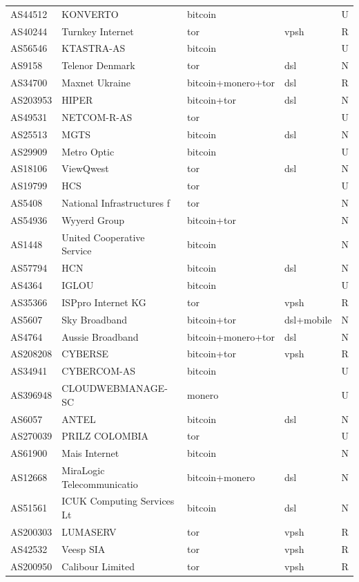 \begin{longtable}{lllll}
AS44512 & KONVERTO & bitcoin &  & U \\ 
AS40244 & Turnkey Internet & tor & vpsh & R \\ 
AS56546 & KTASTRA-AS & bitcoin &  & U \\ 
AS9158 & Telenor Denmark & tor & dsl & N \\ 
AS34700 & Maxnet Ukraine & bitcoin+monero+tor & dsl & R \\ 
AS203953 & HIPER & bitcoin+tor & dsl & N \\ 
AS49531 & NETCOM-R-AS & tor &  & U \\ 
AS25513 & MGTS & bitcoin & dsl & N \\ 
AS29909 & Metro Optic & bitcoin &  & U \\ 
AS18106 & ViewQwest & tor & dsl & N \\ 
AS19799 & HCS & tor &  & U \\ 
AS5408 & National Infrastructures f & tor &  & N \\ 
AS54936 & Wyyerd Group & bitcoin+tor &  & N \\ 
AS1448 & United Cooperative Service & bitcoin &  & N \\ 
AS57794 & HCN & bitcoin & dsl & N \\ 
AS4364 & IGLOU & bitcoin &  & U \\ 
AS35366 & ISPpro Internet KG & tor & vpsh & R \\ 
AS5607 & Sky Broadband & bitcoin+tor & dsl+mobile & N \\ 
AS4764 & Aussie Broadband & bitcoin+monero+tor & dsl & N \\ 
AS208208 & CYBERSE & bitcoin+tor & vpsh & R \\ 
AS34941 & CYBERCOM-AS & bitcoin &  & U \\ 
AS396948 & CLOUDWEBMANAGE-SC & monero &  & U \\ 
AS6057 & ANTEL & bitcoin & dsl & N \\ 
AS270039 & PRILZ COLOMBIA & tor &  & U \\ 
AS61900 & Mais Internet & bitcoin &  & N \\ 
AS12668 & MiraLogic Telecommunicatio & bitcoin+monero & dsl & N \\ 
AS51561 & ICUK Computing Services Lt & bitcoin & dsl & N \\ 
AS200303 & LUMASERV & tor & vpsh & R \\ 
AS42532 & Veesp SIA & tor & vpsh & R \\ 
AS200950 & Calibour Limited & tor & vpsh & R \\ 

\end{longtable}
